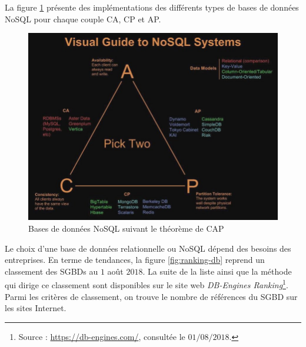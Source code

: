 		La figure \ref{fig:cap} présente des implémentations des différents types de bases de données NoSQL pour chaque couple CA, CP et AP.
		
		\begin{figure}[H]
			\centering
			\captionsetup{justification=centering}
			\includegraphics[width=1\linewidth]{illustrations/cap}
			\caption{Bases de données NoSQL suivant le théorème de CAP }
			\label{fig:cap}
		\end{figure}
		
		
		
		Le choix d'une base de données relationnelle ou NoSQL dépend des besoins des entreprises. En terme de tendances, la figure \ref{fig:ranking-db} reprend un classement des SGBDs au $1$ août $ 2018 $. La suite de la liste ainsi que  la méthode qui dirige ce classement sont    disponibles sur le site  web \textit{DB-Engines Ranking}\footnote{Source : \url{https://db-engines.com/},  consultée le $01/08/2018$.}. Parmi les critères de classement, on trouve le nombre de références du SGBD sur les sites Internet. 
		
		
